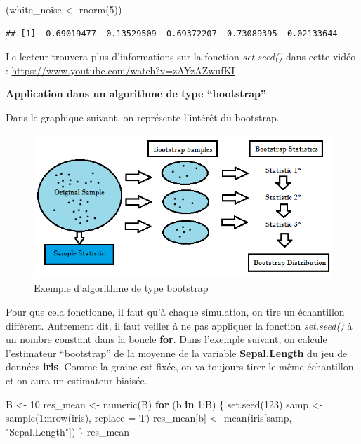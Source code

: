 \documentclass[
]{book}
\newenvironment{Shaded}{\begin{snugshade}}{\end{snugshade}}
\newcommand{\AttributeTok}[1]{\textcolor[rgb]{0.77,0.63,0.00}{#1}}
\newcommand{\ControlFlowTok}[1]{\textcolor[rgb]{0.13,0.29,0.53}{\textbf{#1}}}
\newcommand{\DecValTok}[1]{\textcolor[rgb]{0.00,0.00,0.81}{#1}}
\newcommand{\FunctionTok}[1]{\textcolor[rgb]{0.00,0.00,0.00}{#1}}
\newcommand{\NormalTok}[1]{#1}
\newcommand{\OtherTok}[1]{\textcolor[rgb]{0.56,0.35,0.01}{#1}}
\newcommand{\SpecialCharTok}[1]{\textcolor[rgb]{0.00,0.00,0.00}{#1}}
\newcommand{\StringTok}[1]{\textcolor[rgb]{0.31,0.60,0.02}{#1}}
\theoremstyle{definition}
\theoremstyle{definition}
\theoremstyle{definition}
\theoremstyle{definition}
\theoremstyle{remark}
\begin{document}
\begin{Shaded}
\begin{Highlighting}[]
\NormalTok{(white\_noise }\OtherTok{\textless{}{-}} \FunctionTok{rnorm}\NormalTok{(}\DecValTok{5}\NormalTok{))}
\end{Highlighting}
\end{Shaded}

\begin{verbatim}
## [1]  0.69019477 -0.13529509  0.69372207 -0.73089395  0.02133644
\end{verbatim}

Le lecteur trouvera plus d'informations sur la fonction \emph{set.seed()} dans cette vidéo : \url{https://www.youtube.com/watch?v=zAYzAZwufKI}

\textbf{Application dans un algorithme de type ``bootstrap''}

Dans le graphique suivant, on représente l'intérêt du bootstrap.

\begin{figure}
\centering
\includegraphics{Figures/bootstrap-sample.png}
\caption{Exemple d'algorithme de type bootstrap}
\end{figure}

Pour que cela fonctionne, il faut qu'à chaque simulation, on tire un échantillon différent. Autrement dit, il faut veiller à ne pas appliquer la fonction \emph{set.seed()} à un nombre constant dans la boucle \textbf{for}. Dans l'exemple suivant, on calcule l'estimateur ``bootstrap'' de la moyenne de la variable \textbf{Sepal.Length} du jeu de données \textbf{iris}. Comme la graine est fixée, on va toujours tirer le même échantillon et on aura un estimateur biaisée.

\begin{Shaded}
\begin{Highlighting}[]
\NormalTok{B }\OtherTok{\textless{}{-}} \DecValTok{10}
\NormalTok{res\_mean }\OtherTok{\textless{}{-}} \FunctionTok{numeric}\NormalTok{(B)}
\ControlFlowTok{for}\NormalTok{ (b }\ControlFlowTok{in} \DecValTok{1}\SpecialCharTok{:}\NormalTok{B) \{}
  \FunctionTok{set.seed}\NormalTok{(}\DecValTok{123}\NormalTok{)}
\NormalTok{  samp }\OtherTok{\textless{}{-}} \FunctionTok{sample}\NormalTok{(}\DecValTok{1}\SpecialCharTok{:}\FunctionTok{nrow}\NormalTok{(iris), }\AttributeTok{replace =}\NormalTok{ T)}
\NormalTok{  res\_mean[b] }\OtherTok{\textless{}{-}} \FunctionTok{mean}\NormalTok{(iris[samp, }\StringTok{"Sepal.Length"}\NormalTok{])}
\NormalTok{\}}
\NormalTok{res\_mean}
\end{Highlighting}
\end{Shaded}
\end{document}
